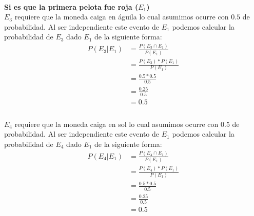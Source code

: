 \documentclass[12pt]{article}
\begin{document}
	  \paragraph{}\textbf{Si es que la primera pelota fue roja ($E_1$)}\\ 
	  $E_3$ requiere que la moneda caiga en águila lo cual asumimos ocurre con $0.5$ de probabilidad. Al ser independiente este evento de $E_1$ podemos calcular la probabilidad de $E_3$ dado $E_1$ de la siguiente forma:
	  \begin{equation}\label{e31}
	  \begin{split}
	  P(E_3|E_1) &= \frac{P(E_3 \cap E_1)}{P(E_1)}\\
	  &= \frac{P(E_3) * P(E_1)}{P(E_1)}\\
	  &= \frac{0.5 * 0.5}{0.5}\\
	  &= \frac{0.25}{0.5}\\
	  &= 0.5\\
	  \end{split}
	  \end{equation}
	  \\
	  $E_4$ requiere que la moneda caiga en sol lo cual asumimos ocurre con $0.5$ de probabilidad. Al ser independiente este evento de $E_1$ podemos calcular la probabilidad de $E_4$ dado $E_1$ de la siguiente forma:
	  \begin{equation}\label{e41}
	  \begin{split}
	  P(E_4|E_1) &= \frac{P(E_4 \cap E_1)}{P(E_1)}\\
	  &= \frac{P(E_4) * P(E_1)}{P(E_1)}\\
	  &= \frac{0.5 * 0.5}{0.5}\\
	   &= \frac{0.25}{0.5}\\
	    &= 0.5\\
	  \end{split}
	  \end{equation}
\end{document}
